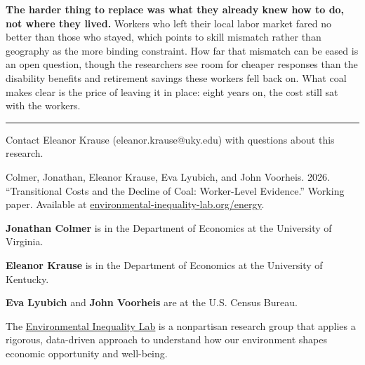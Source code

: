 \documentclass[
  11pt,
]{article}
\newenvironment{moreinfo}{%
  \par\vspace{12pt}%
  \noindent\textcolor{warmrule}{\rule{\linewidth}{0.7pt}}\par
  \vspace{7pt}%
  {\color{ink}\bfseries\fontsize{8.25pt}{10pt}\selectfont
   \textls[50]{\MakeUppercase{For more information}}\par}\vspace{4pt}%
  \color{cite}\fontsize{8.4pt}{11.5pt}\selectfont
  \setlength{\parskip}{5pt}%
}{\par}
\begin{document}
\noindent \textbf{The harder thing to replace was what they already knew how to do, not where they lived.} Workers who left their local labor market fared no better than those who stayed, which points to skill mismatch rather than geography as the more binding constraint. How far that mismatch can be eased is an open question, though the researchers see room for cheaper responses than the disability benefits and retirement savings these workers fell back on. What coal makes clear is the price of leaving it in place: eight years on, the cost still sat with the workers.

\vspace{4pt}

\begin{moreinfo}
Contact Eleanor Krause (eleanor.krause@uky.edu) with questions about this research.\par

Colmer, Jonathan, Eleanor Krause, Eva Lyubich, and John Voorheis. 2026. ``Transitional Costs and the Decline of Coal: Worker-Level Evidence.'' Working paper. Available at \href{https://www.environmental-inequality-lab.org/energy}{\color{cite}\underline{environmental-inequality-lab.org/energy}}.\par

\textbf{Jonathan Colmer} is in the Department of Economics at the University of Virginia.\par
\textbf{Eleanor Krause} is in the Department of Economics at the University of Kentucky.\par
\textbf{Eva Lyubich} and \textbf{John Voorheis} are at the U.S. Census Bureau.\par

The \href{https://www.environmental-inequality-lab.org/}{\color{cite}\underline{Environmental Inequality Lab}} is a nonpartisan research group that applies a rigorous, data-driven approach to understand how our environment shapes economic opportunity and well-being.\par
\end{moreinfo}
\end{document}
